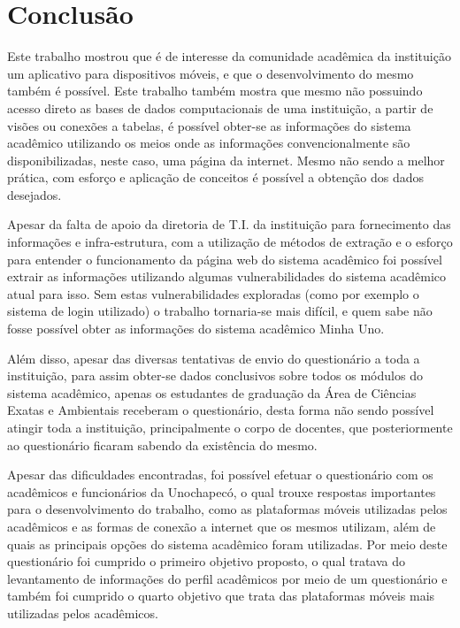 \chapter{Conclusão}

Este trabalho mostrou que é de interesse da comunidade acadêmica da instituição um aplicativo para dispositivos móveis, e que o desenvolvimento do mesmo também é possível. Este trabalho também mostra que mesmo não possuindo acesso direto as bases de dados computacionais de uma instituição, a partir de visões ou conexões a tabelas, é possível obter-se as informações do sistema acadêmico utilizando os meios onde as informações convencionalmente são disponibilizadas, neste caso, uma página da internet. Mesmo não sendo a melhor prática, com esforço e aplicação de conceitos é possível a obtenção dos dados desejados.

Apesar da falta de apoio da diretoria de T.I. da instituição para fornecimento das informações e infra-estrutura, com a utilização de métodos de extração e o esforço para entender o funcionamento da página web do sistema acadêmico foi possível extrair as informações utilizando algumas vulnerabilidades do sistema acadêmico atual para isso. Sem estas vulnerabilidades exploradas (como por exemplo o sistema de login utilizado) o trabalho tornaria-se mais difícil, e quem sabe não fosse possível obter as informações do sistema acadêmico Minha Uno.

Além disso, apesar das diversas tentativas de envio do questionário a toda a instituição, para assim obter-se dados conclusivos sobre todos os módulos do sistema acadêmico, apenas os estudantes de graduação da Área de Ciências Exatas e Ambientais receberam o questionário, desta forma não sendo possível atingir toda a instituição, principalmente o corpo de docentes, que posteriormente ao questionário ficaram sabendo da existência do mesmo.

Apesar das dificuldades encontradas, foi possível efetuar o questionário com os acadêmicos e funcionários da Unochapecó, o qual trouxe respostas importantes para o desenvolvimento do trabalho, como as plataformas móveis utilizadas pelos acadêmicos e as formas de conexão a internet que os mesmos utilizam, além de quais as principais opções do sistema acadêmico foram utilizadas. Por meio deste questionário foi cumprido o primeiro objetivo proposto, o qual tratava do levantamento de informações do perfil acadêmicos por meio de um questionário e também foi cumprido o quarto objetivo que trata das plataformas móveis mais utilizadas pelos acadêmicos.

